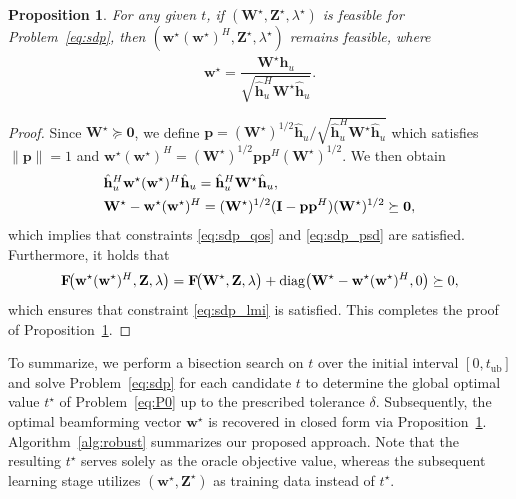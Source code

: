 \documentclass[journal]{IEEEtran}
\newtheorem{proposition}{Proposition}
\begin{document}
\begin{proposition}\label{prop:tight}
For any given $t$, if $(\mathbf{W}^\star,\mathbf{Z}^\star,\lambda^\star)$ is feasible for Problem~\eqref{eq:sdp}, then $(\mathbf{w}^\star(\mathbf{w}^\star)^H,\mathbf{Z}^\star,\lambda^\star)$ remains feasible, where
\begin{equation}
\mathbf{w}^\star = \frac{\mathbf{W}^\star\hat{\mathbf{h}}_u}{\sqrt{\hat{\mathbf{h}}_u^H\mathbf{W}^\star\hat{\mathbf{h}}_u}}.
\label{eq:rank1_recovery}
\end{equation}
\end{proposition}
\begin{proof}
Since $\mathbf{W}^\star \succeq \mathbf{0}$, we define $\mathbf{p} = {(\mathbf{W}^\star)^{1/2}\hat{\mathbf{h}}_u}/{\sqrt{\hat{\mathbf{h}}_u^H\mathbf{W}^\star\hat{\mathbf{h}}_u}}$ which satisfies $\|\mathbf{p}\| = 1$ and $\mathbf{w}^\star(\mathbf{w}^\star)^H = (\mathbf{W}^\star)^{1/2}\mathbf{p}\mathbf{p}^H(\mathbf{W}^\star)^{1/2}$.
We then obtain
\begin{align}
&\hat{\mathbf{h}}_u^H \mathbf{w}^\star(\mathbf{w}^\star)^H \hat{\mathbf{h}}_u = \hat{\mathbf{h}}_u^H \mathbf{W}^\star \hat{\mathbf{h}}_u, \notag\\
&\mathbf{W}^\star - \mathbf{w}^\star(\mathbf{w}^\star)^H = (\mathbf{W}^\star)^{1/2}(\mathbf{I} - \mathbf{p}\mathbf{p}^H)(\mathbf{W}^\star)^{1/2} \succeq\mathbf{0}, \notag
\end{align}
which implies that constraints \eqref{eq:sdp_qos} and \eqref{eq:sdp_psd} are satisfied. Furthermore, it holds that
\[
\mathbf{F}\!\big(\mathbf{w}^\star(\mathbf{w}^\star)^H,\mathbf{Z},\lambda\big)
= \mathbf{F}\!\big(\mathbf{W}^\star,\mathbf{Z},\lambda\big)
+ \operatorname{diag}\!\big(\mathbf{W}^\star-\mathbf{w}^\star(\mathbf{w}^\star)^H, 0\big)
\succeq 0, \notag
\]
which ensures that constraint \eqref{eq:sdp_lmi} is satisfied.
This completes the proof of Proposition~\ref{prop:tight}.
\end{proof}

To summarize, we perform a bisection search on $t$ over the initial interval $[0, t_{\mathrm{ub}}]$ and solve Problem~\eqref{eq:sdp} for each candidate $t$ to determine the global optimal value $t^\star$ of Problem~\eqref{eq:P0} up to the prescribed tolerance $\delta$. Subsequently, the optimal beamforming vector $\mathbf{w}^\star$ is recovered in closed form via Proposition~\ref{prop:tight}. Algorithm~\ref{alg:robust} summarizes our proposed approach. Note that the resulting $t^\star$ serves solely as the oracle objective value, whereas the subsequent learning stage utilizes $(\mathbf{w}^\star, \mathbf{Z}^\star)$ as training data instead of $t^\star$.
\end{document}
